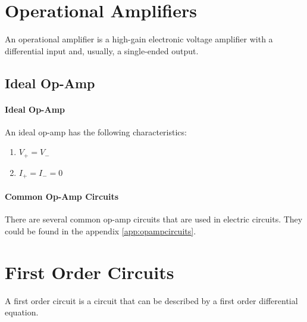 \documentclass[11pt]{report}
\begin{document}
\section{Operational Amplifiers}
\begin{definition}
    An operational amplifier is a high-gain electronic voltage amplifier with a differential input and, usually, a single-ended output.
\end{definition}
\subsection{Ideal Op-Amp}
\paragraph{Ideal Op-Amp} An ideal op-amp has the following characteristics:
\begin{enumerate}
    \item $V_+ = V_-$
    \item $I_+ = I_- = 0$
\end{enumerate}
\paragraph{Common Op-Amp Circuits} There are several common op-amp circuits that are used in electric circuits. They could be found in the appendix \ref{app:opampcircuits}.
\section{First Order Circuits}
\begin{definition}
    A first order circuit is a circuit that can be described by a first order differential equation.
\end{definition}
\appendix

\end{document}
